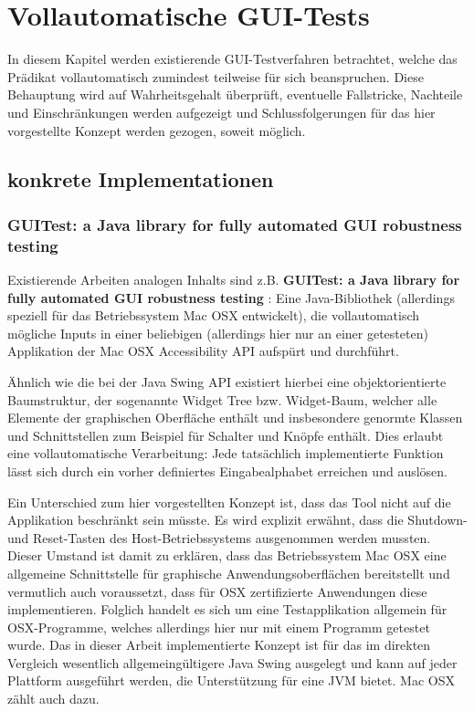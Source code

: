 \chapter{\glqq{}Vollautomatische\grqq{} GUI-Tests}\label{chapter:introfullautoguitesting}


In diesem Kapitel werden existierende GUI-Testverfahren betrachtet, welche das Prädikat
\glqq{}vollautomatisch\grqq{} zumindest teilweise für sich beanspruchen. Diese Behauptung wird
auf Wahrheitsgehalt überprüft, eventuelle Fallstricke, Nachteile und Einschränkungen werden aufgezeigt
und Schlussfolgerungen für das hier vorgestellte Konzept werden gezogen, soweit möglich.


\section{konkrete Implementationen}\label{section:fullautoguitestsimpl}


\subsection{GUITest: a Java library for fully automated GUI robustness testing}

Existierende Arbeiten analogen Inhalts sind z.B. \textbf{\glqq{}GUITest: a Java library for fully automated
GUI robustness testing\grqq{}} \cite{GUITestBauersfeld}: Eine Java-Bibliothek 
(allerdings speziell für das Betriebssystem Mac OSX entwickelt), die
vollautomatisch mögliche Inputs in einer beliebigen (allerdings hier nur an einer getesteten)
Applikation der \glqq{}Mac OSX Accessibility API\grqq{} aufspürt und durchführt.

Ähnlich wie die bei der Java Swing API existiert hierbei eine objektorientierte Baumstruktur,
der sogenannte \glqq{}Widget Tree\grqq{} bzw. Widget-Baum, welcher alle Elemente der graphischen Oberfläche enthält
und insbesondere genormte Klassen und Schnittstellen zum Beispiel für Schalter
und Knöpfe enthält. Dies erlaubt eine vollautomatische Verarbeitung:
Jede tatsächlich implementierte Funktion lässt sich durch ein vorher definiertes
\glqq{}Eingabealphabet\grqq{} erreichen und auslösen.

Ein Unterschied zum
hier vorgestellten Konzept ist, dass das Tool nicht auf die Applikation beschränkt sein müsste. Es wird
explizit erwähnt, dass die Shutdown- und Reset-Tasten des Host-Betriebssystems ausgenommen werden
mussten. Dieser Umstand ist damit zu erklären, dass das Betriebssystem Mac OSX eine allgemeine
Schnittstelle für graphische Anwendungsoberflächen bereitstellt und vermutlich auch voraussetzt,
dass für OSX zertifizierte Anwendungen diese implementieren. Folglich handelt es sich um eine
Testapplikation allgemein für OSX-Programme, welches allerdings hier nur mit einem Programm
getestet wurde. Das in dieser Arbeit implementierte Konzept ist für das im direkten Vergleich 
wesentlich allgemeingültigere Java Swing ausgelegt und kann auf jeder Plattform ausgeführt werden, 
die Unterstützung für eine JVM bietet. Mac OSX zählt auch dazu.

